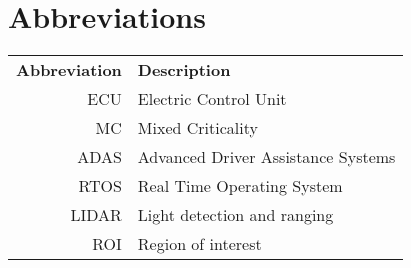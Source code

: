 \chapter*{Abbreviations}
\noindent{}\begin{tabular}{r  l}
\textbf{Abbreviation} 	& \textbf{Description} \vspace{.5em} \\
ECU		&Electric Control Unit\\
MC		&Mixed Criticality\\
ADAS	&Advanced Driver Assistance Systems\\
RTOS	&Real Time Operating System\\
LIDAR	&Light detection and ranging\\
ROI		&Region of interest\\
\end{tabular}